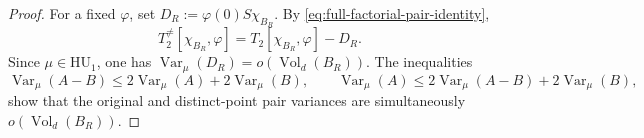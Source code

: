 \documentclass[11pt,reqno,a4paper]{amsart}
\numberwithin{equation}{section}
\theoremstyle{compact}
\theoremstyle{definition}
\theoremstyle{definition}
\newcommand{\HU}{\mathrm{HU}}
\newcommand{\Var}{\operatorname{Var}}
\newcommand{\Vol}{\operatorname{Vol}}
\begin{document}
\begin{proof}
For a fixed $\varphi$, set
$D_R:=\varphi(0)S\chi_{B_R}$.  By \eqref{eq:full-factorial-pair-identity},
\begin{equation}\label{eq:pair-full-factorial-difference}
  T_2^{\neq}[\chi_{B_R},\varphi]
  =T_2[\chi_{B_R},\varphi]-D_R.
\end{equation}
Since $\mu\in\HU_1$, one has
$\Var_\mu(D_R)=o(\Vol_d(B_R))$.  The inequalities
\begin{equation}\label{eq:pair-variance-comparison}
  \Var_\mu(A-B)\leq2\Var_\mu(A)+2\Var_\mu(B),
  \qquad
  \Var_\mu(A)\leq2\Var_\mu(A-B)+2\Var_\mu(B),
\end{equation}
show that the original and distinct-point pair variances are simultaneously
$o(\Vol_d(B_R))$.
\end{proof}
\end{document}
